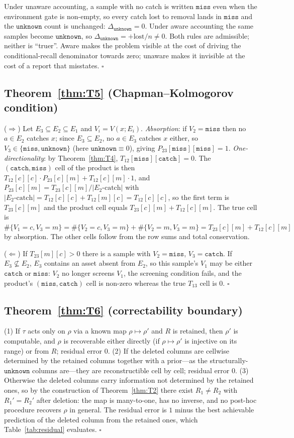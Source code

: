 \documentclass{article}
\newcommand{\catch}{\texttt{catch}}
\newcommand{\miss}{\texttt{miss}}
\newcommand{\unk}{\texttt{unknown}}
\begin{document}
Under unaware accounting, a sample with no catch is written $\miss$ even when the environment gate is
non-empty, so every catch lost to removal lands in $\miss$ and the $\unk$ count is unchanged:
$\Delta_{\unk}=0$. Under aware accounting the same samples become $\unk$, so
$\Delta_{\unk}=+\mathrm{lost}/n\neq0$. Both rules are admissible; neither is ``truer''. Aware makes the
problem visible at the cost of driving the conditional-recall denominator towards zero; unaware makes it
invisible at the cost of a report that misstates. $\square$

\subsection*{Theorem~\ref{thm:T5} (Chapman--Kolmogorov condition)}

($\Rightarrow$) Let $E_3\subseteq E_2\subseteq E_1$ and $V_i=V(x;E_i)$. \emph{Absorption}: if $V_2=\miss$
then no $a\in E_2$ catches $x$; since $E_3\subseteq E_2$, no $a\in E_3$ catches $x$ either, so
$V_3\in\{\miss,\unk\}$ (here $\unk\equiv0$), giving $P_{23}[\miss][\miss]=1$. \emph{One-directionality}:
by Theorem~\ref{thm:T4}, $T_{12}[\miss][\catch]=0$. The $(\catch,\miss)$ cell of the product is then
$T_{12}[c][c]\cdot P_{23}[c][m]+T_{12}[c][m]\cdot1$, and
$P_{23}[c][m]=T_{23}[c][m]/|E_2\text{-catch}|$ with
$|E_2\text{-catch}|=T_{12}[c][c]+T_{12}[m][c]=T_{12}[c][c]$, so the first term is $T_{23}[c][m]$ and the
product cell equals $T_{23}[c][m]+T_{12}[c][m]$. The true cell is
$\#\{V_1{=}c,V_3{=}m\}=\#\{V_2{=}c,V_3{=}m\}+\#\{V_2{=}m,V_3{=}m\}=T_{23}[c][m]+T_{12}[c][m]$ by
absorption. The other cells follow from the row sums and total conservation.

($\Leftarrow$) If $T_{23}[m][c]>0$ there is a sample with $V_2=\miss$, $V_3=\catch$. If
$E_3\not\subseteq E_2$, $E_3$ contains an asset absent from $E_2$, so this sample's $V_1$ may be either
$\catch$ or $\miss$: $V_2$ no longer screens $V_1$, the screening condition fails, and the product's
$(\miss,\catch)$ cell is non-zero whereas the true $T_{13}$ cell is $0$. $\square$

\subsection*{Theorem~\ref{thm:T6} (correctability boundary)}

(1) If $\tau$ acts only on $\rho$ via a known map $\rho\mapsto\rho'$ and $R$ is retained, then $\rho'$ is
computable, and $\rho$ is recoverable either directly (if $\rho\mapsto\rho'$ is injective on its range) or
from $R$; residual error $0$. (2) If the deleted columns are cellwise determined by the retained columns
together with a prior---as the structurally-$\unk$ columns are---they are reconstructible cell by cell;
residual error $0$. (3) Otherwise the deleted columns carry information not determined by the retained ones,
so by the construction of Theorem~\ref{thm:T2} there exist $R_1\neq R_2$ with $R_1'=R_2'$ after deletion:
the map is many-to-one, has no inverse, and no post-hoc procedure recovers $\rho$ in general. The residual
error is $1$ minus the best achievable prediction of the deleted column from the retained ones, which
Table~\ref{tab:residual} evaluates. $\square$
\end{document}
